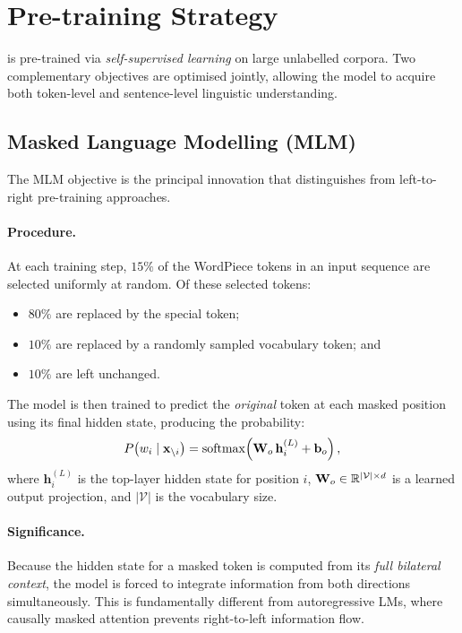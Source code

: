 
\section{Pre-training Strategy}
\label{sec:pretraining}

\bert{} is pre-trained via \emph{self-supervised learning} on large unlabelled
corpora.  Two complementary objectives are optimised jointly, allowing the model to
acquire both token-level and sentence-level linguistic understanding.

\subsection{Masked Language Modelling (MLM)}
\label{subsec:mlm}

The MLM objective is the principal innovation that distinguishes \bert{} from
left-to-right pre-training approaches.

\paragraph{Procedure.}  At each training step, $15\%$ of the WordPiece tokens in
an input sequence are selected uniformly at random.  Of these selected tokens:
\begin{itemize}
  \item $80\%$ are replaced by the special \mask{} token;
  \item $10\%$ are replaced by a randomly sampled vocabulary token; and
  \item $10\%$ are left unchanged.
\end{itemize}
The model is then trained to predict the \emph{original} token at each masked
position using its final hidden state, producing the probability:
\begin{equation}
  P\!\left(w_i \mid \mathbf{x}_{\setminus i}\right)
  = \operatorname{softmax}\!\left(\mathbf{W}_o\,\mathbf{h}_i^{(L)} + \mathbf{b}_o\right),
  \label{eq:mlm}
\end{equation}
where $\mathbf{h}_i^{(L)}$ is the top-layer hidden state for position $i$,
$\mathbf{W}_o \in \mathbb{R}^{|\mathcal{V}| \times d}$ is a learned output projection, and
$|\mathcal{V}|$ is the vocabulary size.

\paragraph{Significance.}  Because the hidden state for a masked token is computed
from its \emph{full bilateral context}, the model is forced to integrate information
from both directions simultaneously.  This is fundamentally different from
autoregressive LMs, where causally masked attention prevents right-to-left
information flow.

